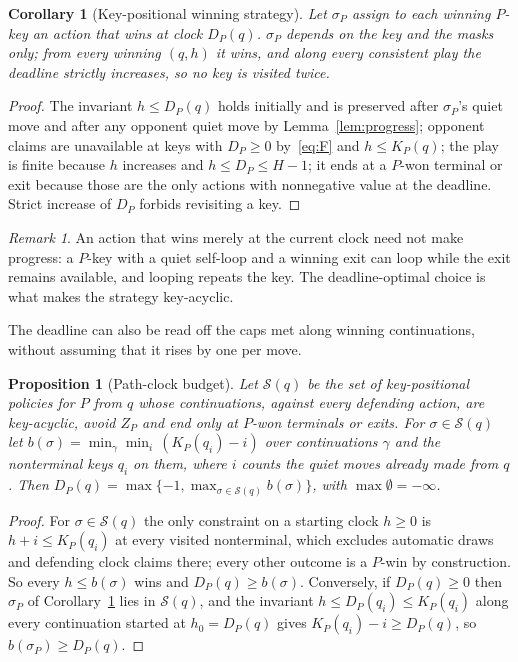 \documentclass[journal]{IEEEtran}
\newtheorem{corollary}{Corollary}
\newtheorem{proposition}{Proposition}
\theoremstyle{definition}
\theoremstyle{remark}
\newtheorem{remark}{Remark}
\begin{document}
\begin{corollary}[Key-positional winning strategy]\label{cor:positional}
Let $\sigma_P$ assign to each winning $P$-key an action that wins at clock $D_P(q)$. $\sigma_P$ depends on the key and the masks only; from every winning $(q,h)$ it wins, and along every consistent play the deadline strictly increases, so no key is visited twice.
\end{corollary}
\begin{proof}
The invariant $h\le D_P(q)$ holds initially and is preserved after $\sigma_P$'s quiet move and after any opponent quiet move by Lemma~\ref{lem:progress}; opponent claims are unavailable at keys with $D_P\ge0$ by~\eqref{eq:F} and $h\le K_P(q)$; the play is finite because $h$ increases and $h\le D_P\le H-1$; it ends at a $P$-won terminal or exit because those are the only actions with nonnegative value at the deadline. Strict increase of $D_P$ forbids revisiting a key.
\end{proof}

\begin{remark}\label{rem:current}
An action that wins merely at the current clock need not make progress: a $P$-key with a quiet self-loop and a winning exit can loop while the exit remains available, and looping repeats the key. The deadline-optimal choice is what makes the strategy key-acyclic.
\end{remark}

The deadline can also be read off the caps met along winning continuations, without assuming that it rises by one per move.

\begin{proposition}[Path-clock budget]\label{prop:budget}
Let $\mathcal S(q)$ be the set of key-positional policies for $P$ from $q$ whose continuations, against every defending action, are key-acyclic, avoid $Z_P$ and end only at $P$-won terminals or exits. For $\sigma\in\mathcal S(q)$ let $b(\sigma)=\min_\gamma\min_i\,(K_P(q_i)-i)$ over continuations $\gamma$ and the nonterminal keys $q_i$ on them, where $i$ counts the quiet moves already made from $q$. Then $D_P(q)=\max\{-1,\max_{\sigma\in\mathcal S(q)}b(\sigma)\}$, with $\max\emptyset=-\infty$.
\end{proposition}
\begin{proof}
For $\sigma\in\mathcal S(q)$ the only constraint on a starting clock $h\ge0$ is $h+i\le K_P(q_i)$ at every visited nonterminal, which excludes automatic draws and defending clock claims there; every other outcome is a $P$-win by construction. So every $h\le b(\sigma)$ wins and $D_P(q)\ge b(\sigma)$. Conversely, if $D_P(q)\ge0$ then $\sigma_P$ of Corollary~\ref{cor:positional} lies in $\mathcal S(q)$, and the invariant $h\le D_P(q_i)\le K_P(q_i)$ along every continuation started at $h_0=D_P(q)$ gives $K_P(q_i)-i\ge D_P(q)$, so $b(\sigma_P)\ge D_P(q)$.
\end{proof}
\end{document}
